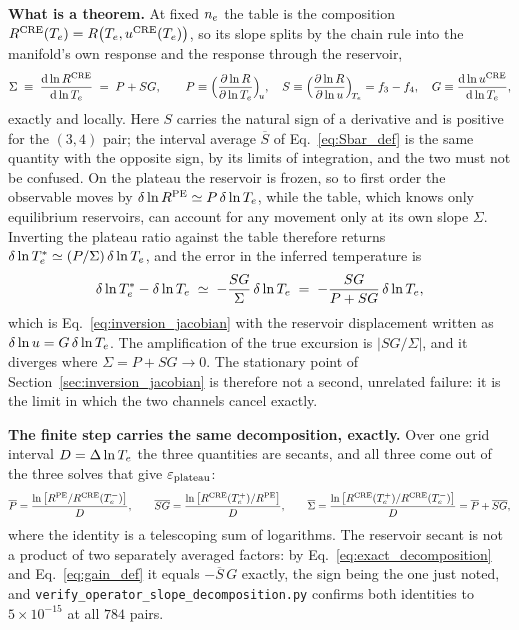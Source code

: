 \textbf{What is a theorem.} At fixed $n_e$ the table is the composition
$R^{\mathrm{CRE}}(T_e) = R\big(T_e, u^{\mathrm{CRE}}(T_e)\big)$, so its slope splits by
the chain rule into the manifold's own response and the response through the
reservoir,
\begin{equation}
  \Sigma \;\equiv\; \frac{\mathrm{d}\ln R^{\mathrm{CRE}}}{\mathrm{d}\ln T_e}
  \;=\; P + SG,
  \qquad
  P \equiv \Big(\frac{\partial\ln R}{\partial\ln T_e}\Big)_{\!u},
  \quad
  S \equiv \Big(\frac{\partial\ln R}{\partial\ln u}\Big)_{\!T_e}
    = f_{3}-f_{4},
  \quad
  G \equiv \frac{\mathrm{d}\ln u^{\mathrm{CRE}}}{\mathrm{d}\ln T_e},
  \label{eq:slope_two_channels}
\end{equation}
exactly and locally. Here $S$ carries the natural sign of a derivative and is
positive for the $(3,4)$ pair; the interval average $\overline{S}$ of
Eq.~\eqref{eq:Sbar_def} is the same quantity with the opposite sign, by its
limits of integration, and the two must not be confused. On the plateau the
reservoir is frozen, so to first order the observable moves by
$\delta\ln R^{\mathrm{PE}} \simeq P\,\delta\ln T_e$, while the table, which knows only
equilibrium reservoirs, can account for any movement only at its own slope
$\Sigma$. Inverting the plateau ratio against the table therefore returns
$\delta\ln T_e^{*} \simeq (P/\Sigma)\,\delta\ln T_e$, and the error in the
inferred temperature is
\begin{equation}
  \delta\ln T_e^{*} - \delta\ln T_e \;\simeq\; -\frac{SG}{\Sigma}\,\delta\ln T_e
  \;=\; -\frac{SG}{P+SG}\,\delta\ln T_e ,
  \label{eq:inversion_local}
\end{equation}
which is Eq.~\eqref{eq:inversion_jacobian} with the reservoir displacement
written as $\delta\ln u = G\,\delta\ln T_e$. The amplification of the true
excursion is $|SG/\Sigma|$, and it diverges where $\Sigma = P + SG \to 0$.
The stationary point of Section~\ref{sec:inversion_jacobian} is therefore not
a second, unrelated failure: it is the limit in which the two channels cancel
exactly.

\textbf{The finite step carries the same decomposition, exactly.} Over one
grid interval $D = \Delta\ln T_e$ the three quantities are secants, and all
three come out of the three solves that give $\varepsilon_{\mathrm{plateau}}$:
\begin{equation}
  \overline{P} = \frac{\ln\big[R^{\mathrm{PE}}/R^{\mathrm{CRE}}(T_e^{-})\big]}{D},
  \qquad
  \overline{SG} = \frac{\ln\big[R^{\mathrm{CRE}}(T_e^{+})/R^{\mathrm{PE}}\big]}{D},
  \qquad
  \overline{\Sigma} = \frac{\ln\big[R^{\mathrm{CRE}}(T_e^{+})/R^{\mathrm{CRE}}(T_e^{-})\big]}{D}
  = \overline{P} + \overline{SG},
  \label{eq:slope_secants}
\end{equation}
where the identity is a telescoping sum of logarithms. The reservoir secant is not a product of two separately averaged
factors: by Eq.~\eqref{eq:exact_decomposition} and Eq.~\eqref{eq:gain_def} it
equals $-\overline{S}\,G$ exactly, the sign being the one just noted, and
\texttt{verify\_operator\_slope\_decomposition.py} confirms both identities to
$5\times10^{-15}$ at all $784$ pairs.

